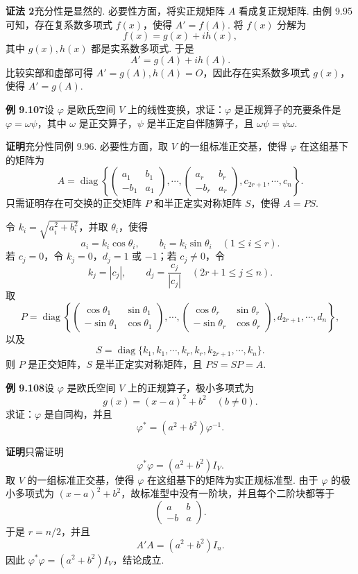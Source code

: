 \documentclass[UTF8, 12pt, fontset=fandol, oneside]{ctexart}
\begin{document}
\noindent\textbf{证法 2}\quad 充分性是显然的. 必要性方面，将实正规矩阵 $A$ 看成复正规矩阵. 由例 9.95 可知，存在复系数多项式 $f(x)$，使得 $A'=f(A)$. 将 $f(x)$ 分解为
\[
f(x)=g(x)+ih(x),
\]
其中 $g(x),h(x)$ 都是实系数多项式. 于是
\[
A'=g(A)+ih(A).
\]
比较实部和虚部可得 $A'=g(A),h(A)=O$，因此存在实系数多项式 $g(x)$，使得 $A'=g(A)$.

\noindent\textbf{例 9.107}\quad 设 $\varphi$ 是欧氏空间 $V$ 上的线性变换，求证：$\varphi$ 是正规算子的充要条件是 $\varphi=\omega\psi$，其中 $\omega$ 是正交算子，$\psi$ 是半正定自伴随算子，且 $\omega\psi=\psi\omega$.

\noindent\textbf{证明}\quad 充分性同例 9.96. 必要性方面，取 $V$ 的一组标准正交基，使得 $\varphi$ 在这组基下的矩阵为
\[
A=\operatorname{diag}\left\{
\begin{pmatrix}
a_1&b_1\\
-b_1&a_1
\end{pmatrix},\cdots,
\begin{pmatrix}
a_r&b_r\\
-b_r&a_r
\end{pmatrix},
c_{2r+1},\cdots,c_n
\right\}.
\]
只需证明存在可交换的正交矩阵 $P$ 和半正定实对称矩阵 $S$，使得 $A=PS$.

令 $k_i=\sqrt{a_i^2+b_i^2}$，并取 $\theta_i$，使得
\[
a_i=k_i\cos\theta_i,\qquad b_i=k_i\sin\theta_i\quad (1\le i\le r).
\]
若 $c_j=0$，令 $k_j=0$，$d_j=1$ 或 $-1$；若 $c_j\ne0$，令
\[
k_j=|c_j|,\qquad d_j=\frac{c_j}{|c_j|}\quad (2r+1\le j\le n).
\]
取
\[
P=\operatorname{diag}\left\{
\begin{pmatrix}
\cos\theta_1&\sin\theta_1\\
-\sin\theta_1&\cos\theta_1
\end{pmatrix},\cdots,
\begin{pmatrix}
\cos\theta_r&\sin\theta_r\\
-\sin\theta_r&\cos\theta_r
\end{pmatrix},
d_{2r+1},\cdots,d_n
\right\},
\]
以及
\[
S=\operatorname{diag}\{k_1,k_1,\cdots,k_r,k_r,k_{2r+1},\cdots,k_n\}.
\]
则 $P$ 是正交矩阵，$S$ 是半正定实对称矩阵，且 $PS=SP=A$.

\noindent\textbf{例 9.108}\quad 设 $\varphi$ 是欧氏空间 $V$ 上的正规算子，极小多项式为
\[
g(x)=(x-a)^2+b^2\quad (b\ne0).
\]
求证：$\varphi$ 是自同构，并且
\[
\varphi^*=(a^2+b^2)\varphi^{-1}.
\]

\noindent\textbf{证明}\quad 只需证明
\[
\varphi^*\varphi=(a^2+b^2)I_V.
\]
取 $V$ 的一组标准正交基，使得 $\varphi$ 在这组基下的矩阵为实正规标准型. 由于 $\varphi$ 的极小多项式为 $(x-a)^2+b^2$，故标准型中没有一阶块，并且每个二阶块都等于
\[
\begin{pmatrix}
a&b\\
-b&a
\end{pmatrix}.
\]
于是 $r=n/2$，并且
\[
A'A=(a^2+b^2)I_n.
\]
因此 $\varphi^*\varphi=(a^2+b^2)I_V$，结论成立.
\end{document}
